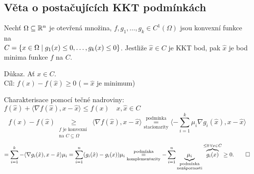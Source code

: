 \subsection{Věta o postačujících KKT podmínkách}
Nechť $\Omega \subseteq \mathbb{R}^n$ je otevřená množina, $f, g_1, \dots, g_k \in C^1(\Omega)$ jsou konvexní funkce na \\
$C = \left\lbrace x \in \Omega \mid g_1(x) \leq 0, \dots, g_k(x) \leq 0 \right\rbrace$. Jestliže $\hat x \in C$ je KKT bod, pak $\hat x$ je 
bod minima funkce $f$ na $C$.

Důkaz. Ať $x \in C$. \\
Cíl: $f(x) - f(\hat x) \geq 0$ ($= \hat x$ je minimum)

Charakterisace pomocí tečné nadroviny: $f(\hat x) + \langle \nabla f(\hat x), x - \hat x\rangle \leq f(x) \quad x, 
\hat x \in C$
\[
    f(x) - f(\hat x) \underset{\substack{\text{$f$ je konvexní } \\ \text{na $C \subseteq \Omega$}} }{\geq} \langle 
    \nabla f(\hat x), x - \hat x\rangle \underset{\text{stacionarity}}{\overset{\text{podmínka}}{=}} 
    \langle - \sum_{i=1}^{k} \mu_i \nabla g_i(\hat x), x - \hat x\rangle
\]
\[
    = \sum_{i=1}^{k} - \langle \nabla g_i(\hat x), x - \hat x \rangle \mu_i = \sum_{i=1}^{n} (g_i(\hat x) - g_i(x)) \mu_i 
    \underset{\text{komplementarity}}{\overset{\text{podmínka}}{=}} - \sum_{i=1}^{n}    
    \underbrace{\mu_i}_{\substack{\text{podmínka}\\ \text{nezápornosti}}} \overbrace{g_i(x)}^{\leq 0 \, \forall x \in C}
    \geq 0. \qed
\]

